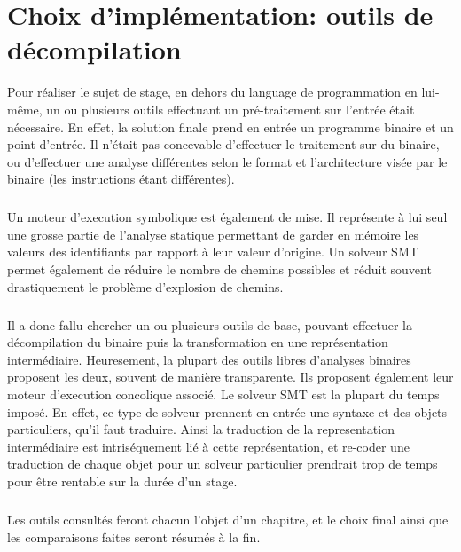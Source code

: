 \section{Choix d'implémentation: outils de décompilation}
Pour réaliser le sujet de stage, en dehors du language de programmation en lui-même, un ou plusieurs outils effectuant
un pré-traitement sur l'entrée était nécessaire. En effet, la solution finale prend en entrée un programme binaire et un point
d'entrée. Il n'était pas concevable d'effectuer le traitement sur du binaire, ou d'effectuer une analyse différentes selon le format
et l'architecture visée par le binaire (les instructions étant différentes).
\subparagraph{}
Un moteur d'execution symbolique est également de mise. Il représente à lui seul une grosse partie de l'analyse statique permettant de
garder en mémoire les valeurs des identifiants par rapport à leur valeur d'origine. Un solveur SMT permet également de réduire le nombre
de chemins possibles et réduit souvent drastiquement le problème d'explosion de chemins.
\subparagraph{}
Il a donc fallu chercher un ou plusieurs outils de base, pouvant effectuer la décompilation du binaire puis la transformation en une
représentation intermédiaire. Heuresement, la plupart des outils libres d'analyses binaires proposent les deux, souvent de manière transparente.
Ils proposent également leur moteur d'execution concolique associé. Le solveur SMT est la plupart du temps imposé. En effet, ce type de solveur prennent
en entrée une syntaxe et des objets particuliers, qu'il faut traduire. Ainsi la traduction de la representation intermédiaire est intriséquement lié à cette
représentation, et re-coder une traduction de chaque objet pour un solveur particulier prendrait trop de temps pour être rentable sur la durée d'un stage.
\subparagraph{}
Les outils consultés feront chacun l'objet d'un chapitre, et le choix final ainsi que les comparaisons faites seront résumés à la fin.

